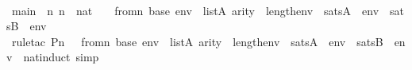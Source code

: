 \begin{isabellebody}
%
\isadelimproof
%
\endisadelimproof
%
\isatagproof
{}\isamarkupfalse%
\ {\isacharminus}{\kern0pt}\ \isanewline
\ \ \isamarkupfalse%
\ main\ {\isacharcolon}{\kern0pt}\ {\isachardoublequoteopen}{\isasymAnd}n{\isachardot}{\kern0pt}\ n\ {\isasymin}\ nat\ {\isasymLongrightarrow}\ {\isasymforall}{\isasymphi}\ {\isasymin}\ {\isasymDelta}{}{\isacharunderscore}{\kern0pt}from{\isacharcircum}{\kern0pt}n\ {\isacharparenleft}{\kern0pt}{\isasymDelta}{}{\isacharunderscore}{\kern0pt}base{\isacharparenright}{\kern0pt}{\isachardot}{\kern0pt}\ {\isacharparenleft}{\kern0pt}{\isasymforall}env\ {\isasymin}\ list{\isacharparenleft}{\kern0pt}A{\isacharparenright}{\kern0pt}{\isachardot}{\kern0pt}\ arity{\isacharparenleft}{\kern0pt}{\isasymphi}{\isacharparenright}{\kern0pt}\ {\isasymle}\ length{\isacharparenleft}{\kern0pt}env{\isacharparenright}{\kern0pt}\ {\isasymlongrightarrow}\ {\isacharparenleft}{\kern0pt}sats{\isacharparenleft}{\kern0pt}A{\isacharcomma}{\kern0pt}\ {\isasymphi}{\isacharcomma}{\kern0pt}\ env{\isacharparenright}{\kern0pt}\ {\isasymlongleftrightarrow}\ sats{\isacharparenleft}{\kern0pt}B{\isacharcomma}{\kern0pt}\ {\isasymphi}{\isacharcomma}{\kern0pt}\ env{\isacharparenright}{\kern0pt}{\isacharparenright}{\kern0pt}{\isacharparenright}{\kern0pt}{\isachardoublequoteclose}\ \isanewline
\ \ \isamarkupfalse%
\ {\isacharparenleft}{\kern0pt}rule{\isacharunderscore}{\kern0pt}tac\ P{\isacharequal}{\kern0pt}{\isachardoublequoteopen}{\isasymlambda}n{\isachardot}{\kern0pt}\ {\isasymforall}{\isasymphi}\ {\isasymin}\ {\isasymDelta}{}{\isacharunderscore}{\kern0pt}from{\isacharcircum}{\kern0pt}n\ {\isacharparenleft}{\kern0pt}{\isasymDelta}{}{\isacharunderscore}{\kern0pt}base{\isacharparenright}{\kern0pt}{\isachardot}{\kern0pt}\ {\isacharparenleft}{\kern0pt}{\isasymforall}env\ {\isasymin}\ list{\isacharparenleft}{\kern0pt}A{\isacharparenright}{\kern0pt}{\isachardot}{\kern0pt}\ arity{\isacharparenleft}{\kern0pt}{\isasymphi}{\isacharparenright}{\kern0pt}\ {\isasymle}\ length{\isacharparenleft}{\kern0pt}env{\isacharparenright}{\kern0pt}\ {\isasymlongrightarrow}\ {\isacharparenleft}{\kern0pt}sats{\isacharparenleft}{\kern0pt}A{\isacharcomma}{\kern0pt}\ {\isasymphi}{\isacharcomma}{\kern0pt}\ env{\isacharparenright}{\kern0pt}\ {\isasymlongleftrightarrow}\ sats{\isacharparenleft}{\kern0pt}B{\isacharcomma}{\kern0pt}\ {\isasymphi}{\isacharcomma}{\kern0pt}\ env{\isacharparenright}{\kern0pt}{\isacharparenright}{\kern0pt}{\isacharparenright}{\kern0pt}{\isachardoublequoteclose}\ \ nat{\isacharunderscore}{\kern0pt}induct{\isacharcomma}{\kern0pt}\ simp{\isacharparenright}{\kern0pt}\isanewline

\end{isabellebody}
